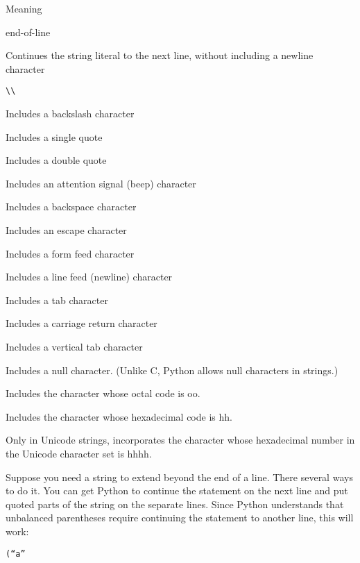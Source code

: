 Meaning


end-of-line

Continues the string literal to the
next line, without including a newline character


\texttt{\textbackslash{}\textbackslash{}}

Includes a backslash character



Includes a single quote



Includes a double quote



Includes an attention signal (beep)
character



Includes a backspace character



Includes an escape character



Includes a form feed character



Includes a line feed (newline)
character



Includes a tab character



Includes a carriage return
character



Includes a vertical tab character



Includes a null character. (Unlike
C, Python allows null characters in strings.)



Includes the character whose octal
code is oo.



Includes the character whose
hexadecimal code is hh.



Only in Unicode strings,
incorporates the character whose hexadecimal number in the Unicode
character set is hhhh.

Suppose you need a string to extend
beyond the end of a line. There several ways to do it. You can get
Python to continue the statement on the next line and put quoted parts
of the string on the separate lines. Since Python understands that
unbalanced parentheses require continuing the statement to another line,
this will work:


\texttt{(``a''}



